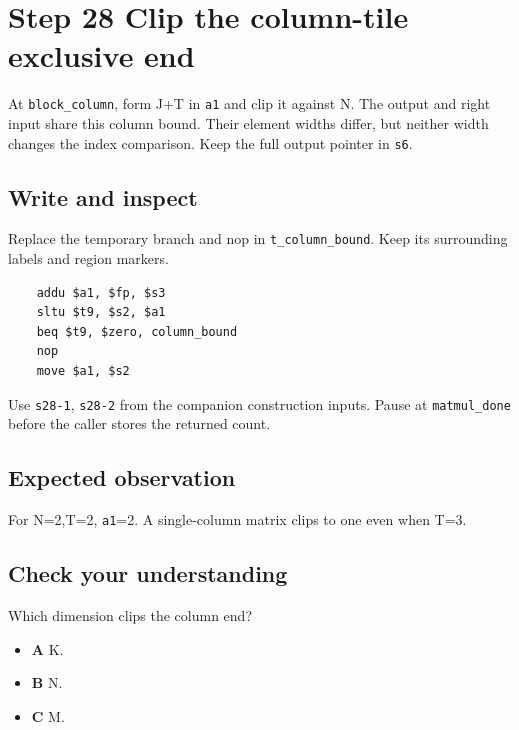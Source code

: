 \section{Step 28 Clip the column-tile exclusive end}\label{matmul-s28}

At \texttt{block\_column}, form J+T in \texttt{a1} and clip it against N. The output and right input share this column bound. Their element widths differ, but neither width changes the index comparison. Keep the full output pointer in \texttt{s6}.

\subsection{Write and inspect}
Replace the temporary branch and nop in \texttt{t\_column\_bound}. Keep its surrounding labels and region markers.

\begin{verbatim}
    addu $a1, $fp, $s3
    sltu $t9, $s2, $a1
    beq $t9, $zero, column_bound
    nop
    move $a1, $s2
\end{verbatim}
Use \texttt{s28-1}, \texttt{s28-2} from the companion construction inputs. Pause at \texttt{matmul\_done} before the caller stores the returned count.

\subsection{Expected observation}
For N=2,T=2, \texttt{a1}=2. A single-column matrix clips to one even when T=3.

\subsection{Check your understanding}
Which dimension clips the column end?

\begin{itemize}
\item \textbf{A} K.
\item \textbf{B} N.
\item \textbf{C} M.
\end{itemize}
